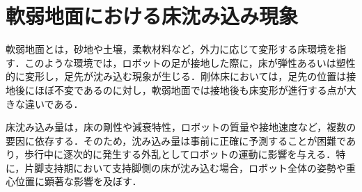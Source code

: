 
\section{軟弱地面における床沈み込み現象}

軟弱地面とは，砂地や土壌，柔軟材料など，外力に応じて変形する床環境を指す．このような環境では，ロボットの足が接地した際に，床が弾性あるいは塑性的に変形し，足先が沈み込む現象が生じる．剛体床においては，足先の位置は接地後にほぼ不変であるのに対し，軟弱地面では接地後も床変形が進行する点が大きな違いである．

床沈み込み量は，床の剛性や減衰特性，ロボットの質量や接地速度など，複数の要因に依存する．そのため，沈み込み量は事前に正確に予測することが困難であり，歩行中に逐次的に発生する外乱としてロボットの運動に影響を与える．特に，片脚支持期において支持脚側の床が沈み込む場合，ロボット全体の姿勢や重心位置に顕著な影響を及ぼす．
